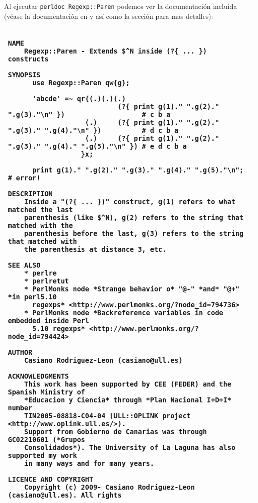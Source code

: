 Al ejecutar \verb|perldoc Regexp::Paren| podemos ver la documentación
incluida (véase la documentación en  y 
así como la sección  
para mas detalles):

\begin{tabular}{|p{22cm}|}
\hline
\begin{verbatim}
NAME
    Regexp::Paren - Extends $^N inside (?{ ... }) constructs

SYNOPSIS
      use Regexp::Paren qw{g};

      'abcde' =~ qr{(.)(.)(.)
                           (?{ print g(1)." ".g(2)." ".g(3)."\n" })                   # c b a
                   (.)     (?{ print g(1)." ".g(2)." ".g(3)." ".g(4)."\n" })          # d c b a
                   (.)     (?{ print g(1)." ".g(2)." ".g(3)." ".g(4)." ".g(5)."\n" }) # e d c b a
                  }x;

      print g(1)." ".g(2)." ".g(3)." ".g(4)." ".g(5)."\n"; # error!

DESCRIPTION
    Inside a "(?{ ... })" construct, g(1) refers to what matched the last
    parenthesis (like $^N), g(2) refers to the string that matched with the
    parenthesis before the last, g(3) refers to the string that matched with
    the parenthesis at distance 3, etc.

SEE ALSO
    * perlre
    * perlretut
    * PerlMonks node *Strange behavior o* "@-" *and* "@+" *in perl5.10
      regexps* <http://www.perlmonks.org/?node_id=794736>
    * PerlMonks node *Backreference variables in code embedded inside Perl
      5.10 regexps* <http://www.perlmonks.org/?node_id=794424>

AUTHOR
    Casiano Rodriguez-Leon (casiano@ull.es)

ACKNOWLEDGMENTS
    This work has been supported by CEE (FEDER) and the Spanish Ministry of
    *Educacion y Ciencia* through *Plan Nacional I+D+I* number
    TIN2005-08818-C04-04 (ULL::OPLINK project <http://www.oplink.ull.es/>).
    Support from Gobierno de Canarias was through GC02210601 (*Grupos
    Consolidados*). The University of La Laguna has also supported my work
    in many ways and for many years.

LICENCE AND COPYRIGHT
    Copyright (c) 2009- Casiano Rodriguez-Leon (casiano@ull.es). All rights

\end{verbatim}\\
\hline
\end{tabular}

